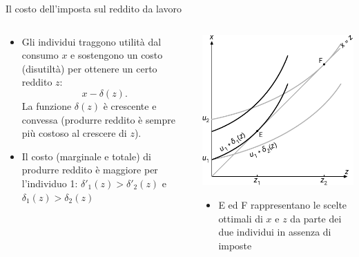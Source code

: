 \documentclass[11pt]{beamer}
\begin{document}
\begin{frame}{Il costo dell'imposta sul reddito da lavoro}
\begin{columns}
\begin{column}{.45\columnwidth}
\begin{itemize}
\item Gli individui traggono utilità dal consumo $x$ e sostengono un costo
(disutiltà) per ottenere un certo reddito $z$: $$x-\delta(z).$$ La funzione
$\delta(z)$ è crescente e convessa (produrre reddito è sempre più costoso al
crescere di $z$).
\item Il costo (marginale e totale) di produrre reddito è maggiore per l'individuo
1: $\delta'_1(z)> \delta'_2(z)$ e $\delta_1(z)>\delta_2(z)$
\end{itemize}
\end{column}

\begin{column}{.45\columnwidth}
\begin{center}
\includegraphics[scale=.7]{./figure/effetto-distorsivo-imposte-ql-1.pdf}
\end{center}

\small
\begin{itemize}
\item E ed F rappresentano le scelte ottimali di $x$ e $z$ da parte dei due
individui in assenza di imposte
\end{itemize}
\end{column}
\end{columns}
\end{frame}
\end{document}
